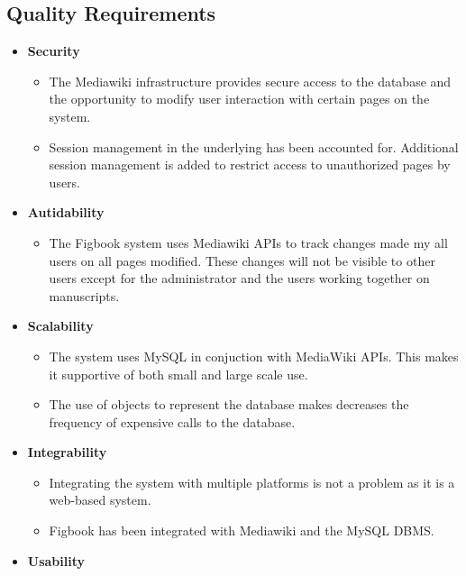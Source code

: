 \renewcommand{\labelitemii}{$\star$}
%

\subsection{Quality Requirements}

\begin{itemize}
	\item \textbf{Security}
	\begin{itemize}
		\item The Mediawiki infrastructure provides secure access to the database and the opportunity to modify user interaction with certain pages on the system.
		\item Session management in the underlying has been accounted for. Additional session management is added to restrict access to unauthorized pages by users.
	\end{itemize}
	\item \textbf{Autidability}
	\begin{itemize}
		\item The Figbook system uses Mediawiki APIs to track changes made my all users on all pages modified. These changes will not be visible to other users except for the administrator and the users working together on manuscripts.
	\end{itemize}
	\item \textbf{Scalability}
	\begin{itemize}
		\item The system uses MySQL in conjuction with MediaWiki APIs. This makes it supportive of both small and large scale use.
		\item The use of objects to represent the database makes decreases the frequency of expensive calls to the database.
	\end{itemize}
	\item \textbf{Integrability}
	\begin{itemize}
		\item Integrating the system with multiple platforms is not a problem as it is a web-based system.
		\item Figbook has been integrated with Mediawiki and the MySQL DBMS.
	\end{itemize}
	\item \textbf{Usability}
	\begin{itemize}

\end{itemize}
\end{itemize}
